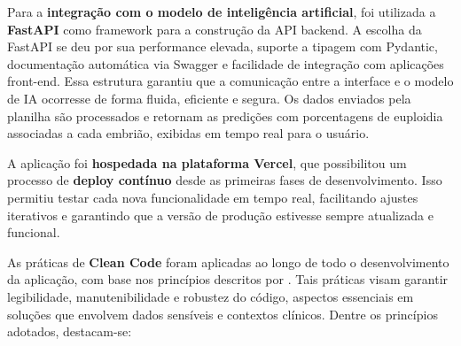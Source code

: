 Para a \textbf{integração com o modelo de inteligência artificial}, foi utilizada a \textbf{FastAPI} como framework para a construção da API backend. A escolha da FastAPI se deu por sua performance elevada, suporte a tipagem com Pydantic, documentação automática via Swagger e facilidade de integração com aplicações front-end. Essa estrutura garantiu que a comunicação entre a interface e o modelo de IA ocorresse de forma fluida, eficiente e segura. Os dados enviados pela planilha são processados e retornam as predições com porcentagens de euploidia associadas a cada embrião, exibidas em tempo real para o usuário.

A aplicação foi \textbf{hospedada na plataforma Vercel}, que possibilitou um processo de \textbf{deploy contínuo} desde as primeiras fases de desenvolvimento. Isso permitiu testar cada nova funcionalidade em tempo real, facilitando ajustes iterativos e garantindo que a versão de produção estivesse sempre atualizada e funcional.

As práticas de \textbf{Clean Code} foram aplicadas ao longo de todo o desenvolvimento da aplicação, com base nos princípios descritos por . Tais práticas visam garantir legibilidade, manutenibilidade e robustez do código, aspectos essenciais em soluções que envolvem dados sensíveis e contextos clínicos. Dentre os princípios adotados, destacam-se:

